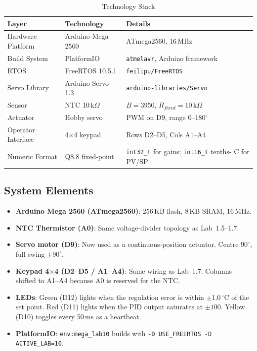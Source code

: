 \documentclass[12pt]{article}
\begin{document}
\begin{table}[H]
\centering
\begin{tabular}{@{}lll@{}}
\toprule
\textbf{Layer} & \textbf{Technology} & \textbf{Details} \\
\midrule
Hardware Platform    & Arduino Mega 2560  & ATmega2560, 16\,MHz \\
Build System         & PlatformIO         & \texttt{atmelavr}, Arduino framework \\
RTOS                 & FreeRTOS 10.5.1    & \texttt{feilipu/FreeRTOS} \\
Servo Library        & Arduino Servo 1.3  & \texttt{arduino-libraries/Servo} \\
Sensor               & NTC 10\,k$\Omega$  & $B = 3950$, $R_{fixed} = 10$\,k$\Omega$ \\
Actuator             & Hobby servo        & PWM on D9, range 0--180$^{\circ}$ \\
Operator Interface   & 4$\times$4 keypad  & Rows D2--D5, Cols A1--A4 \\
Numeric Format       & Q8.8 fixed-point   & \texttt{int32\_t} for gains; \texttt{int16\_t} tenths-$^{\circ}$C for PV/SP \\
\bottomrule
\end{tabular}
\caption{Technology Stack}
\label{tab:techstack}
\end{table}

\subsection{System Elements}

\begin{itemize}
  \item \textbf{Arduino Mega 2560 (ATmega2560)}: 256\,KB flash, 8\,KB SRAM, 16\,MHz.
  \item \textbf{NTC Thermistor (A0)}: Same voltage-divider topology as Lab~1.5--1.7.
  \item \textbf{Servo motor (D9)}: Now used as a continuous-position actuator. Centre $90^{\circ}$, full swing $\pm 90^{\circ}$.
  \item \textbf{Keypad 4$\times$4 (D2--D5 / A1--A4)}: Same wiring as Lab~1.7. Columns shifted to A1--A4 because A0 is reserved for the NTC.
  \item \textbf{LEDs}: Green (D12) lights when the regulation error is within $\pm$1.0\,$^{\circ}$C of the set point. Red (D11) lights when the PID output saturates at $\pm 100$. Yellow (D10) toggles every 50\,ms as a heartbeat.
  \item \textbf{PlatformIO}: \texttt{env:mega\_lab10} builds with \texttt{-D USE\_FREERTOS -D ACTIVE\_LAB=10}. \cite{pio}
\end{itemize}
\end{document}
